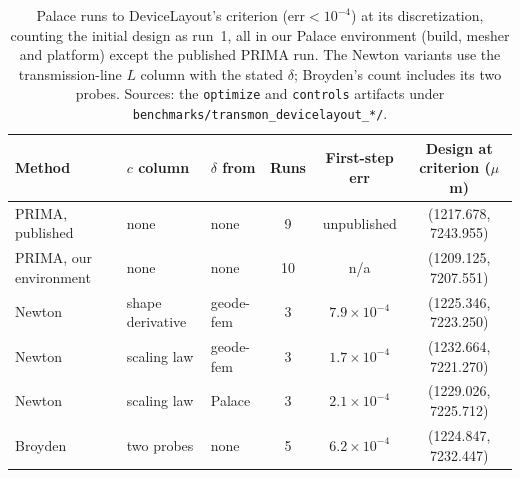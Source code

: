 \documentclass{anvil-paper}
\begin{document}
\begin{table}[htbp]
  \centering
  \caption{Palace runs to DeviceLayout's criterion ($\mathrm{err} <
  10^{-4}$) at its discretization, counting the initial design as run~1,
  all in our Palace environment (build, mesher and platform) except the
  published PRIMA run. The Newton variants use the transmission-line $L$
  column with the stated $\delta$; Broyden's count includes its two probes.
  Sources: the \texttt{optimize} and \texttt{controls} artifacts under
  \texttt{benchmarks/transmon\_devicelayout\_*/}.}
  \label{tab:controls}
  \footnotesize
  \begin{tabular}{@{}lllccc@{}}
    \toprule
    Method & $c$ column & $\delta$ from & Runs & First-step err & Design at criterion ($\mu$m) \\
    \midrule
    PRIMA, published & none & none & 9 & unpublished & (1217.678, 7243.955) \\
    PRIMA, our environment & none & none & 10 & n/a & (1209.125, 7207.551) \\
    Newton & shape derivative & geode-fem & 3 & $7.9\times10^{-4}$ & (1225.346, 7223.250) \\
    Newton & scaling law & geode-fem & 3 & $1.7\times10^{-4}$ & (1232.664, 7221.270) \\
    Newton & scaling law & Palace & 3 & $2.1\times10^{-4}$ & (1229.026, 7225.712) \\
    Broyden & two probes & none & 5 & $6.2\times10^{-4}$ & (1224.847, 7232.447) \\
    \bottomrule
  \end{tabular}
\end{table}
\end{document}
